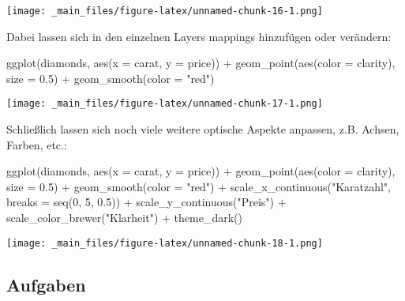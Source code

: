 \documentclass[11pt,german,a4paper]{article}
\newenvironment{Shaded}{\begin{snugshade}}{\end{snugshade}}
\newcommand{\AttributeTok}[1]{\textcolor[rgb]{0.77,0.63,0.00}{#1}}
\newcommand{\DecValTok}[1]{\textcolor[rgb]{0.00,0.00,0.81}{#1}}
\newcommand{\FloatTok}[1]{\textcolor[rgb]{0.00,0.00,0.81}{#1}}
\newcommand{\FunctionTok}[1]{\textcolor[rgb]{0.00,0.00,0.00}{#1}}
\newcommand{\NormalTok}[1]{#1}
\newcommand{\SpecialCharTok}[1]{\textcolor[rgb]{0.00,0.00,0.00}{#1}}
\newcommand{\StringTok}[1]{\textcolor[rgb]{0.31,0.60,0.02}{#1}}
\begin{document}
\texttt{[image: \_main\_files/figure-latex/unnamed-chunk-16-1.png]}

Dabei lassen sich in den einzelnen Layers mappings hinzufügen oder verändern:

\begin{Shaded}
\begin{Highlighting}[]
\FunctionTok{ggplot}\NormalTok{(diamonds, }\FunctionTok{aes}\NormalTok{(}\AttributeTok{x =}\NormalTok{ carat, }\AttributeTok{y =}\NormalTok{ price)) }\SpecialCharTok{+}
  \FunctionTok{geom\_point}\NormalTok{(}\FunctionTok{aes}\NormalTok{(}\AttributeTok{color =}\NormalTok{ clarity), }\AttributeTok{size =} \FloatTok{0.5}\NormalTok{) }\SpecialCharTok{+}
  \FunctionTok{geom\_smooth}\NormalTok{(}\AttributeTok{color =} \StringTok{"red"}\NormalTok{)}
\end{Highlighting}
\end{Shaded}

\texttt{[image: \_main\_files/figure-latex/unnamed-chunk-17-1.png]}

Schließlich lassen sich noch viele weitere optische Aspekte anpassen, z.B. Achsen, Farben, etc.:

\begin{Shaded}
\begin{Highlighting}[]
\FunctionTok{ggplot}\NormalTok{(diamonds, }\FunctionTok{aes}\NormalTok{(}\AttributeTok{x =}\NormalTok{ carat, }\AttributeTok{y =}\NormalTok{ price)) }\SpecialCharTok{+}
  \FunctionTok{geom\_point}\NormalTok{(}\FunctionTok{aes}\NormalTok{(}\AttributeTok{color =}\NormalTok{ clarity), }\AttributeTok{size =} \FloatTok{0.5}\NormalTok{) }\SpecialCharTok{+}
  \FunctionTok{geom\_smooth}\NormalTok{(}\AttributeTok{color =} \StringTok{"red"}\NormalTok{) }\SpecialCharTok{+}
  \FunctionTok{scale\_x\_continuous}\NormalTok{(}\StringTok{"Karatzahl"}\NormalTok{, }\AttributeTok{breaks =} \FunctionTok{seq}\NormalTok{(}\DecValTok{0}\NormalTok{, }\DecValTok{5}\NormalTok{, }\FloatTok{0.5}\NormalTok{)) }\SpecialCharTok{+}
  \FunctionTok{scale\_y\_continuous}\NormalTok{(}\StringTok{"Preis"}\NormalTok{) }\SpecialCharTok{+}
  \FunctionTok{scale\_color\_brewer}\NormalTok{(}\StringTok{"Klarheit"}\NormalTok{) }\SpecialCharTok{+}
  \FunctionTok{theme\_dark}\NormalTok{()}
\end{Highlighting}
\end{Shaded}

\texttt{[image: \_main\_files/figure-latex/unnamed-chunk-18-1.png]}

\hypertarget{aufgaben}{%
\subsection{Aufgaben}\label{aufgaben}}
\end{document}
